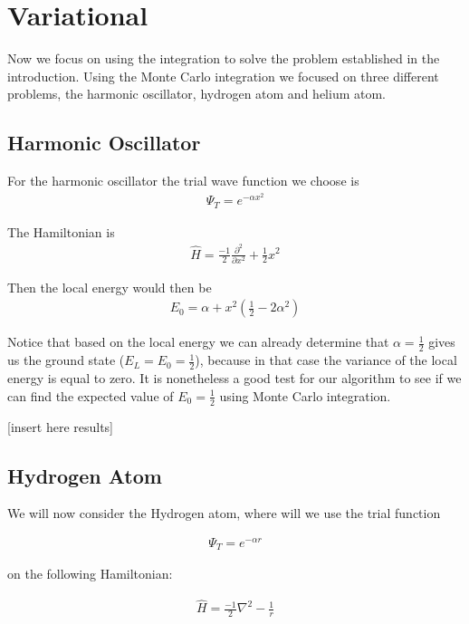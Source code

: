 
\section{Variational}
 Now we focus on using the integration to solve the problem established in the introduction.
 Using the Monte Carlo integration we focused on three different problems, the harmonic oscillator,
 hydrogen atom and helium atom.

\subsection{Harmonic Oscillator}
  For the harmonic oscillator the trial wave function we choose is
  \begin{align}
    \Psi_T = e^{-\alpha x^2}
  \end{align}

  The Hamiltonian is
  \begin{align}
    \hat{H} = \frac{-1}{2}\frac{\partial^2}{ \partial x^2} + \frac{1}{2} x^2
  \end{align}
  
  Then the local energy would then be  
  \begin{align}
    E_0 = \alpha + x^2(\frac{1}{2} - 2\alpha^2)
  \end{align}  
 	
  Notice that based on the local energy we can already determine that $\alpha = \frac{1}{2}$ gives us the ground state ($E_L = E_0 = \frac{1}{2}$), because in that case the variance of the local energy is equal to zero. It is nonetheless a good test for our algorithm to see if we can find the expected value of $E_0 = \frac{1}{2}$ using Monte Carlo integration. 
  
  [insert here results]
  
\subsection{Hydrogen Atom}
We will now consider the Hydrogen atom, where will we use the trial function 

  \begin{align}
    \Psi_T = e^{-\alpha r}
  \end{align}

on the following Hamiltonian:
  
  \begin{align}
    \hat{H} = \frac{-1}{2}\nabla^2 - \frac{1}{r}
  \end{align}
  
